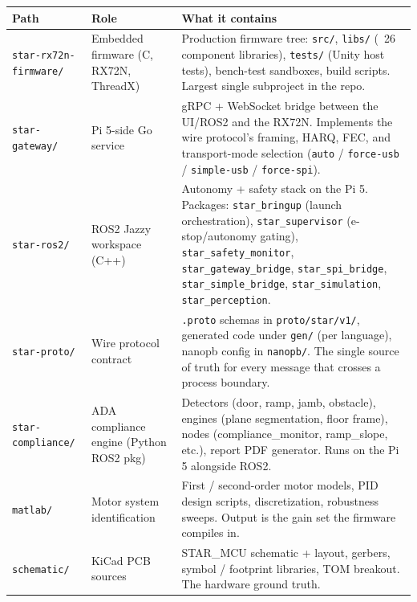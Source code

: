 \begin{center}
\begin{tabular}{|p{3.2cm}|p{4.0cm}|p{7.5cm}|}
\hline
\textbf{Path}                 & \textbf{Role}                            & \textbf{What it contains}                                                            \\
\hline
\texttt{star-rx72n-firmware/} & Embedded firmware (C, RX72N, ThreadX)    & Production firmware tree: \texttt{src/}, \texttt{libs/} (~26 component libraries), \texttt{tests/} (Unity host tests), bench-test sandboxes, build scripts. Largest single subproject in the repo. \\
\hline
\texttt{star-gateway/}        & Pi 5-side Go service                     & gRPC + WebSocket bridge between the UI/ROS2 and the RX72N. Implements the wire protocol's framing, HARQ, FEC, and transport-mode selection (\texttt{auto} / \texttt{force-usb} / \texttt{simple-usb} / \texttt{force-spi}). \\
\hline
\texttt{star-ros2/}           & ROS2 Jazzy workspace (C++)               & Autonomy + safety stack on the Pi 5. Packages: \texttt{star\_bringup} (launch orchestration), \texttt{star\_supervisor} (e-stop/autonomy gating), \texttt{star\_safety\_monitor}, \texttt{star\_gateway\_bridge}, \texttt{star\_spi\_bridge}, \texttt{star\_simple\_bridge}, \texttt{star\_simulation}, \texttt{star\_perception}. \\
\hline
\texttt{star-proto/}          & Wire protocol contract                   & \texttt{.proto} schemas in \texttt{proto/star/v1/}, generated code under \texttt{gen/} (per language), nanopb config in \texttt{nanopb/}. The single source of truth for every message that crosses a process boundary. \\
\hline
\texttt{star-compliance/}     & ADA compliance engine (Python ROS2 pkg)  & Detectors (door, ramp, jamb, obstacle), engines (plane segmentation, floor frame), nodes (compliance\_monitor, ramp\_slope, etc.), report PDF generator. Runs on the Pi 5 alongside ROS2. \\
\hline
\texttt{matlab/}              & Motor system identification              & First / second-order motor models, PID design scripts, discretization, robustness sweeps. Output is the gain set the firmware compiles in. \\
\hline
\texttt{schematic/}           & KiCad PCB sources                        & STAR\_MCU schematic + layout, gerbers, symbol / footprint libraries, TOM breakout. The hardware ground truth. \\

\end{tabular}
\end{center}
